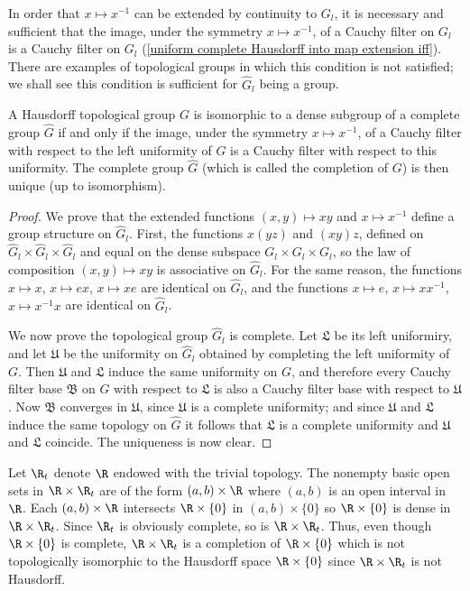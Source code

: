 In order that $x\mapsto x^{-1}$ can be extended by continuity to $G_l$, it is necessary and sufficient that the image, under the symmetry $x\mapsto x^{-1}$, of a Cauchy filter on $G_l$ is a Cauchy filter on $G_l$ (\cref{uniform complete Hausdorff into map extension iff}). There are examples of topological groups in which this condition is not satisfied; we shall see this condition is sufficient for $\widehat{G}_l$ being a group.
\begin{theorem}\label{topological group completion if}
A Hausdorff topological group $G$ is isomorphic to a dense subgroup of a complete group $\widehat{G}$ if and only if the image, under the symmetry $x\mapsto x^{-1}$, of a Cauchy filter with respect to the left uniformity of $G$ is a Cauchy filter with respect to this uniformity. The complete group $\widehat{G}$ (which is called the completion of $G$) is then unique (up to isomorphism).
\end{theorem}
\begin{proof}
We prove that the extended functions $(x,y)\mapsto xy$ and $x\mapsto x^{-1}$ define a group structure on $\widehat{G}_l$. First, the functions $x(yz)$ and $(xy)z$, defined on $\widehat{G}_l\times\widehat{G}_l\times\widehat{G}_l$ and equal on the dense subspace $G_l\times G_l\times G_l$, so the law of composition $(x,y)\mapsto xy$ is associative on $\widehat{G}_l$. For the same reason, the functions $x\mapsto x$, $x\mapsto ex$, $x\mapsto xe$ are identical on $\widehat{G}_l$, and the functions $x\mapsto e$, $x\mapsto xx^{-1}$, $x\mapsto x^{-1}x$ are identical on $\widehat{G}_l$.\par
We now prove the topological group $\widehat{G}_l$ is complete. Let $\mathfrak{L}$ be its left uniformiry, and let $\mathfrak{U}$ be the uniformity on $\widehat{G}_l$ obtained by completing the left uniformity of $G$. Then $\mathfrak{U}$ and $\mathfrak{L}$ induce the same uniformity on $G$, and therefore every Cauchy filter base $\mathfrak{B}$ on $G$ with respect to $\mathfrak{L}$ is also a Cauchy filter base with respect to $\mathfrak{U}$. Now $\mathfrak{B}$ converges in $\mathfrak{U}$, since $\mathfrak{U}$ is a complete uniformity; and since $\mathfrak{U}$ and $\mathfrak{L}$ induce the same topology on $\widehat{G}$ it follows that $\mathfrak{L}$ is a complete uniformity and $\mathfrak{U}$ and $\mathfrak{L}$ coincide. The uniqueness is now clear.
\end{proof}
\begin{example}
Let $\R_t$ denote $\R$ endowed with the trivial topology. The nonempty basic open sets in $\R\times\R_t$ are of the form $(a,b)\times\R$ where $(a,b)$ is an open interval in $\R$. Each $(a,b)\times\R$ intersects $\R\times\{0\}$ in $(a,b)\times\{0\}$ so $\R\times\{0\}$ is dense in $\R\times\R_t$. Since $\R_t$ is obviously complete, so is $\R\times\R_t$. Thus, even though $\R\times\{0\}$ is complete, $\R\times\R_t$ is a completion of $\R\times\{0\}$ which is not topologically isomorphic to the Hausdorff space $\R\times\{0\}$ since $\R\times\R_t$ is not Hausdorff.
\end{example}
